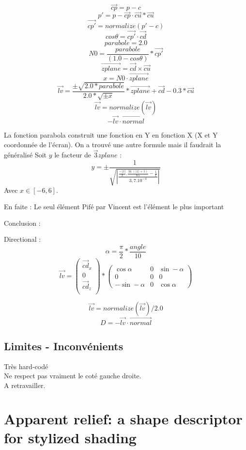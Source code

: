 \documentclass[a4paper]{article}
\begin{document}
\[ \vec{cp} = p - c\]
\[ p' = p - \vec{cp} \cdot{\vec{cu}} * \vec{cu}\]
\[ \vec{cp'} = normalize(p' - c) \]
\[ cos\theta = \vec{cp'} \cdot{\vec{cd}}\] 
\[ parabole = 2.0 \]
\[ N0 = \frac{parabole}{(1.0 - cos\theta)} * \vec{cp'}\]
\[\vec{zplane} = \vec{cd} \times \vec{cu}\]
\[x = N0\cdot{\vec{zplane}}\]
\[\vec{lv} = \frac{\pm\sqrt{2.0*parabole}}{2.0*\sqrt{\pm x}} * \vec{zplane} + \vec{cd} - 0.3* \vec{cu} \]
\[\vec{lv} = normalize(\vec{lv})\]
\[ -\vec{lv} \cdot \vec{normal}\]




La fonction parabola construit une fonction en Y en fonction X (X et Y coordonnée de l'écran). 
On a trouvé une autre formule mais il faudrait la généralisé 
Soit $y$ le facteur de $\vec3{zplane}$ : 
\[ y = \pm \frac{1}{\sqrt{\left| \frac{\frac{-|x|}{x} . \frac{\ln(|x|+1)}{65} - \frac{1}{x}}{3,7.10^{-4}} \right|}}\]
Avec $x\in [-6,6]$.

En faite : Le seul élément Pifé par Vincent est l'élément le plus important 


Conclusion : 

Directional :
\[\alpha = \frac{\pi}{2} * \frac{angle}{10}\]
\[\vec{lv} =  
\begin{pmatrix}
\vec{cd}_x \\
0 \\
\vec{cd}_z \\
\end{pmatrix} *
\begin{pmatrix}
\cos\alpha & 0 & \sin-\alpha \\
0 & 0 & 0 \\
-\sin-\alpha & 0 & \cos\alpha 
\end{pmatrix}\]

\[\vec{lv} = normalize(\vec{lv}) / 2.0 \]
\[ D = -\vec{lv} \cdot{\vec{normal}} \]


\subsection{Limites - Inconvénients} 
Très hard-codé \\
Ne respect pas vraiment le coté gauche droite.  \\
A retravailler. \\



\section{Apparent relief: a shape descriptor for stylized shading}
\end{document}
